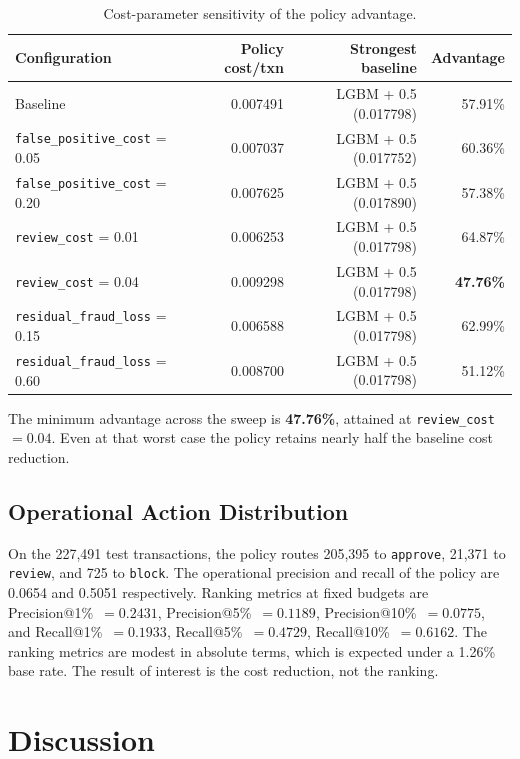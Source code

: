 \documentclass[conference]{IEEEtran}
\begin{document}
\begin{table}[!t]
\caption{Cost-parameter sensitivity of the policy advantage.}
\label{tab:sens}
\centering
\begin{tabular}{lrrr}
\toprule
Configuration & Policy cost/txn & Strongest baseline & Advantage \\
\midrule
Baseline & 0.007491 & LGBM + 0.5 (0.017798) & 57.91\% \\
\texttt{false\_positive\_cost} = 0.05 & 0.007037 & LGBM + 0.5 (0.017752) & 60.36\% \\
\texttt{false\_positive\_cost} = 0.20 & 0.007625 & LGBM + 0.5 (0.017890) & 57.38\% \\
\texttt{review\_cost} = 0.01 & 0.006253 & LGBM + 0.5 (0.017798) & 64.87\% \\
\texttt{review\_cost} = 0.04 & 0.009298 & LGBM + 0.5 (0.017798) & \textbf{47.76\%} \\
\texttt{residual\_fraud\_loss} = 0.15 & 0.006588 & LGBM + 0.5 (0.017798) & 62.99\% \\
\texttt{residual\_fraud\_loss} = 0.60 & 0.008700 & LGBM + 0.5 (0.017798) & 51.12\% \\
\bottomrule
\end{tabular}
\end{table}

The minimum advantage across the sweep is \textbf{47.76\%}, attained at
\texttt{review\_cost} $=0.04$. Even at that worst case the policy retains
nearly half the baseline cost reduction.

\subsection{Operational Action Distribution}

On the 227,491 test transactions, the policy routes 205,395 to
\texttt{approve}, 21,371 to \texttt{review}, and 725 to \texttt{block}.
The operational precision and recall of the policy are 0.0654 and 0.5051
respectively. Ranking metrics at fixed budgets are Precision@1\%~$=0.2431$,
Precision@5\%~$=0.1189$, Precision@10\%~$=0.0775$, and
Recall@1\%~$=0.1933$, Recall@5\%~$=0.4729$, Recall@10\%~$=0.6162$. The
ranking metrics are modest in absolute terms, which is expected under a
1.26\% base rate. The result of interest is the cost reduction, not the
ranking.

\section{Discussion}
\end{document}
